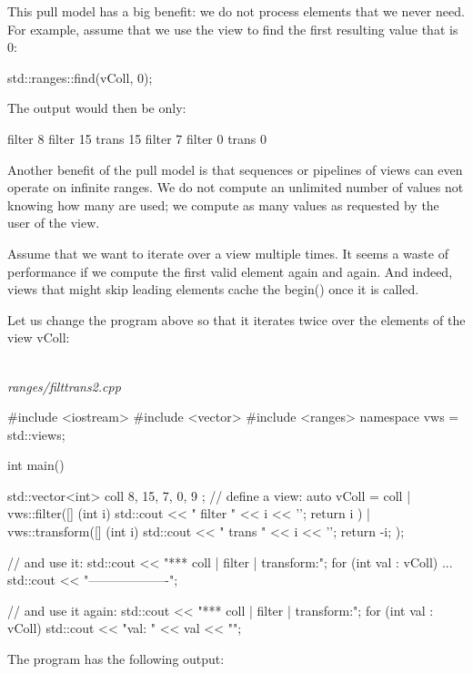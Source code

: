 This pull model has a big benefit: we do not process elements that we never need. For example, assume that we use the view to find the first resulting value that is 0:

\begin{cpp}
std::ranges::find(vColl, 0);
\end{cpp}

The output would then be only:

{\footnotesize
\begin{shell}
filter 8
filter 15
trans 15
filter 7
filter 0
trans 0
\end{shell}
}

Another benefit of the pull model is that sequences or pipelines of views can even operate on infinite ranges. We do not compute an unlimited number of values not knowing how many are used; we compute as many values as requested by the user of the view.


Assume that we want to iterate over a view multiple times. It seems a waste of performance if we compute the first valid element again and again. And indeed, views that might skip leading elements cache the begin() once it is called.

Let us change the program above so that it iterates twice over the elements of the view vColl:

\noindent
\hspace*{\fill} \\ %
\textit{ranges/filttrans2.cpp}

\begin{cpp}
#include <iostream>
#include <vector>
#include <ranges>
namespace vws = std::views;

int main()
{
	std::vector<int> coll{ 8, 15, 7, 0, 9 };
	// define a view:
	auto vColl = coll
	| vws::filter([] (int i) {
		std::cout << " filter " << i << '\n';
		return i %
	})
	| vws::transform([] (int i) {
		std::cout << " trans " << i << '\n';
		return -i;
	});
	
	// and use it:
	std::cout << "*** coll | filter | transform:\n";
	for (int val : vColl) {
		...
	}
	std::cout << "-------------------\n";
	
	// and use it again:
	std::cout << "*** coll | filter | transform:\n";
	for (int val : vColl) {
		std::cout << "val: " << val << "\n\n";
	}
}
\end{cpp}

The program has the following output:

